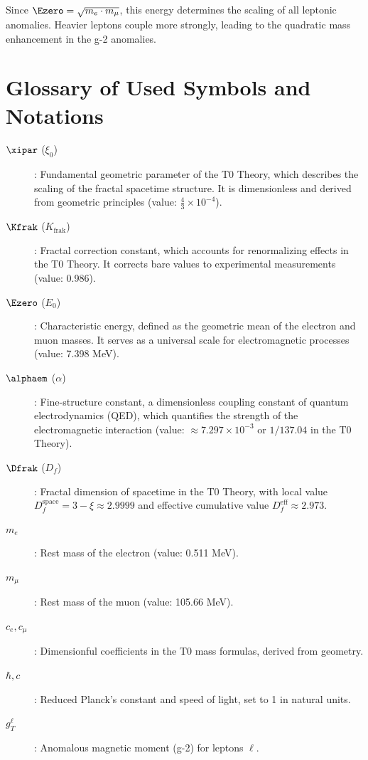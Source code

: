	Since $\Ezero = \sqrt{m_e \cdot m_\mu}$, this energy determines the scaling of all leptonic anomalies. Heavier leptons couple more strongly, leading to the quadratic mass enhancement in the g-2 anomalies.
	
	\section{Glossary of Used Symbols and Notations}
	\begin{description}
		\item[$\xipar$ ($\xi_0$)]: Fundamental geometric parameter of the T0 Theory, which describes the scaling of the fractal spacetime structure. It is dimensionless and derived from geometric principles (value: $\frac{4}{3} \times 10^{-4}$).
		\item[$\Kfrak$ ($K_{\text{frak}}$)]: Fractal correction constant, which accounts for renormalizing effects in the T0 Theory. It corrects bare values to experimental measurements (value: 0.986).
		\item[$\Ezero$ ($E_0$)]: Characteristic energy, defined as the geometric mean of the electron and muon masses. It serves as a universal scale for electromagnetic processes (value: 7.398 MeV).
		\item[$\alphaem$ ($\alpha$)]: Fine-structure constant, a dimensionless coupling constant of quantum electrodynamics (QED), which quantifies the strength of the electromagnetic interaction (value: $\approx 7.297 \times 10^{-3}$ or $1/137.04$ in the T0 Theory).
		\item[$\Dfrak$ ($D_f$)]: Fractal dimension of spacetime in the T0 Theory, with local value $D_f^{\text{space}} = 3 - \xi \approx 2.9999$ and effective cumulative value $D_f^{\text{eff}} \approx 2.973$.
		\item[$m_e$]: Rest mass of the electron (value: 0.511 MeV).
		\item[$m_\mu$]: Rest mass of the muon (value: 105.66 MeV).
		\item[$c_e, c_\mu$]: Dimensionful coefficients in the T0 mass formulas, derived from geometry.
		\item[$\hbar, c$]: Reduced Planck's constant and speed of light, set to 1 in natural units.
		\item[$g_T^\ell$]: Anomalous magnetic moment (g-2) for leptons $\ell$.
	\end{description}
